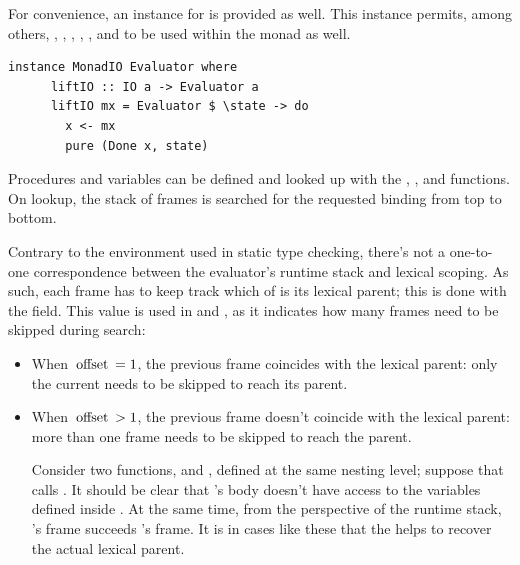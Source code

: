 \documentclass[UdineBachThesis,american,11pt,draft]{PhdThesis}
\begin{document}
  For convenience, an instance for \lstinline@MonadIO@ is provided as well. This
  instance permits, among others, \lstinline@newRef@, \lstinline@readRef@,
  \lstinline@writeRef@, \lstinline@cloneRef@, \lstinline@compareRefs@,
  \lstinline@cloneVals@ and \lstinline@compareVals@ to be used within the
  \lstinline@Evaluator@ monad as well.

  \begin{lstlisting}[gobble=4,basicstyle=\ttfamily\small]
    instance MonadIO Evaluator where
      liftIO :: IO a -> Evaluator a
      liftIO mx = Evaluator $ \state -> do
        x <- mx
        pure (Done x, state)
  \end{lstlisting}

  Procedures and variables can be defined and looked up with the
  \lstinline@defineFun@, \lstinline@lookupFun@, \lstinline@defineVar@ and
  \lstinline@lookupVar@ functions. On lookup, the stack of frames is searched
  for the requested binding from top to bottom.

  Contrary to the environment used in static type checking, there's not a
  one-to-one correspondence between the evaluator's runtime stack and lexical
  scoping. As such, each frame has to keep track which of is its lexical parent;
  this is done with the \lstinline@offset@ field. This value is used in
  \lstinline@lookupFun@ and \lstinline@lookupVar@, as it indicates how many
  frames need to be skipped during search:

  \begin{itemize}
    \item When $\text{\lstinline@offset@} = 1$, the previous frame coincides
    with the lexical parent: only the current needs to be skipped to reach its
    parent.

    \item When $\text{\lstinline@offset@} > 1$, the previous frame doesn't
    coincide with the lexical parent: more than one frame needs to be skipped to
    reach the parent.

    Consider two functions, \lstinline@f@ and \lstinline@g@, defined at the same
    nesting level; suppose that \lstinline@f@ calls \lstinline@g@. It should be
    clear that \lstinline@g@'s body doesn't have access to the variables defined
    inside \lstinline@f@. At the same time, from the perspective of the runtime
    stack, \lstinline@g@'s frame succeeds \lstinline@f@'s frame. It is in cases
    like these that the \lstinline@offset@ helps to recover the actual lexical
    parent.
  \end{itemize}
\end{document}
